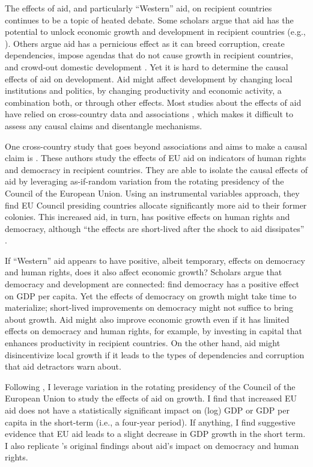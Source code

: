 \documentclass[12pt, ]{article}
\begin{document}
The effects of aid, and particularly ``Western'' aid, on recipient
countries continues to be a topic of heated debate. Some scholars argue
that aid has the potential to unlock economic growth and development in
recipient countries (e.g., \citet{sachs2005end}). Others argue aid has a
pernicious effect as it can breed corruption, create dependencies,
impose agendas that do not cause growth in recipient countries, and
crowd-out domestic development
\citep{easterly2006white, pritchett2015can}. Yet it is hard to determine
the causal effects of aid on development. Aid might affect development
by changing local institutions and politics, by changing productivity
and economic activity, a combination both, or through other effects.
Most studies about the effects of aid have relied on cross-country data
and associations \citep{edwards2014economic}, which makes it difficult
to assess any causal claims and disentangle mechanisms.

One cross-country study that goes beyond associations and aims to make a
causal claim is \citet{carnegie2017foreign}. These authors study the
effects of EU aid on indicators of human rights and democracy in
recipient countries. They are able to isolate the causal effects of aid
by leveraging as-if-random variation from the rotating presidency of the
Council of the European Union. Using an instrumental variables approach,
they find EU Council presiding countries allocate significantly more aid
to their former colonies. This increased aid, in turn, has positive
effects on human rights and democracy, although ``the effects are
short-lived after the shock to aid dissipates''
\citep{carnegie2017foreign}.

If ``Western'' aid appears to have positive, albeit temporary, effects
on democracy and human rights, does it also affect economic growth?
Scholars argue that democracy and development are connected:
\citet{acemoglu2019democracy} find democracy has a positive effect on
GDP per capita. Yet the effects of democracy on growth might take time
to materialize; short-lived improvements on democracy might not suffice
to bring about growth. Aid might also improve economic growth even if it
has limited effects on democracy and human rights, for example, by
investing in capital that enhances productivity in recipient countries.
On the other hand, aid might disincentivize local growth if it leads to
the types of dependencies and corruption that aid detractors warn about.

Following \citet{carnegie2017foreign}, I leverage variation in the
rotating presidency of the Council of the European Union to study the
effects of aid on growth. I find that increased EU aid does not have a
statistically significant impact on (log) GDP or GDP per capita in the
short-term (i.e., a four-year period). If anything, I find suggestive
evidence that EU aid leads to a slight decrease in GDP growth in the
short term. I also replicate \citet{carnegie2017foreign}'s original
findings about aid's impact on democracy and human rights.
\end{document}
